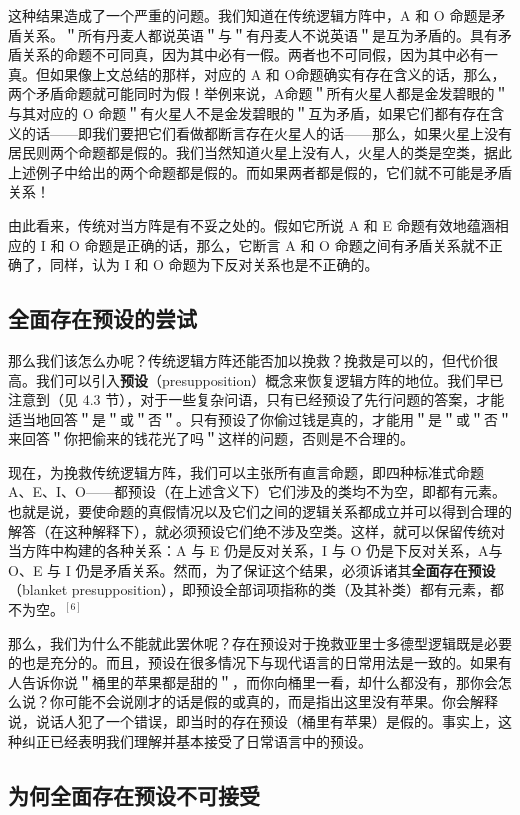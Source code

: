 这种结果造成了一个严重的问题。我们知道在传统逻辑方阵中，A 和 O 命题是矛盾关系。＂所有丹麦人都说英语＂与＂有丹麦人不说英语＂是互为矛盾的。具有矛盾关系的命题不可同真，因为其中必有一假。两者也不可同假，因为其中必有一真。但如果像上文总结的那样，对应的 A 和 O命题确实有存在含义的话，那么，两个矛盾命题就可能同时为假！举例来说，A命题＂所有火星人都是金发碧眼的＂与其对应的 O 命题＂有火星人不是金发碧眼的＂互为矛盾，如果它们都有存在含义的话——即我们要把它们看做都断言存在火星人的话——那么，如果火星上没有居民则两个命题都是假的。我们当然知道火星上没有人，火星人的类是空类，据此上述例子中给出的两个命题都是假的。而如果两者都是假的，它们就不可能是矛盾关系！

由此看来，传统对当方阵是有不妥之处的。假如它所说 A 和 E 命题有效地蕴涵相应的 I 和 O 命题是正确的话，那么，它断言 A 和 O 命题之间有矛盾关系就不正确了，同样，认为 I 和 O 命题为下反对关系也是不正确的。

\subsection{全面存在预设的尝试}

那么我们该怎么办呢？传统逻辑方阵还能否加以挽救？挽救是可以的，但代价很高。我们可以引入\textbf{预设}（presupposition）概念来恢复逻辑方阵的地位。我们早已注意到（见 4.3 节），对于一些复杂问语，只有已经预设了先行问题的答案，才能适当地回答＂是＂或＂否＂。只有预设了你偷过钱是真的，才能用＂是＂或＂否＂来回答＂你把偷来的钱花光了吗＂这样的问题，否则是不合理的。

现在，为挽救传统逻辑方阵，我们可以主张所有直言命题，即四种标准式命题 A、E、I、O——都预设（在上述含义下）它们涉及的类均不为空，即都有元素。也就是说，要使命题的真假情况以及它们之间的逻辑关系都成立并可以得到合理的解答（在这种解释下），就必须预设它们绝不涉及空类。这样，就可以保留传统对当方阵中构建的各种关系：A 与 E 仍是反对关系，I 与 O 仍是下反对关系，A与 O、E 与 I 仍是矛盾关系。然而，为了保证这个结果，必须诉诸其\textbf{全面存在预设}（blanket presupposition），即预设全部词项指称的类（及其补类）都有元素，都不为空。$^{[6]}$

那么，我们为什么不能就此罢休呢？存在预设对于挽救亚里士多德型逻辑既是必要的也是充分的。而且，预设在很多情况下与现代语言的日常用法是一致的。如果有人告诉你说＂桶里的苹果都是甜的＂，而你向桶里一看，却什么都没有，那你会怎么说？你可能不会说刚才的话是假的或真的，而是指出这里没有苹果。你会解释说，说话人犯了一个错误，即当时的存在预设（桶里有苹果）是假的。事实上，这种纠正已经表明我们理解并基本接受了日常语言中的预设。

\subsection{为何全面存在预设不可接受}

